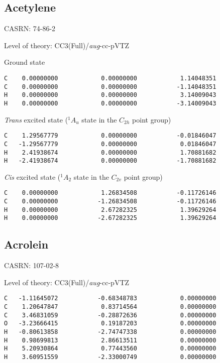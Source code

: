 \documentclass[journal=jctcce,manuscript=article,layout=traditional]{achemso}
\newcommand{\AVTZ}{\emph{aug}-cc-pVTZ}
\begin{document}
\subsection{Acetylene}

CASRN: 74-86-2

\begin{singlespace}
\noindent Level of theory: CC3(Full)/{\AVTZ}
\end{singlespace}

\begin{singlespace}
\noindent Ground state
\begin{verbatim}
C    0.00000000            0.00000000            1.14048351
C    0.00000000            0.00000000           -1.14048351
H    0.00000000            0.00000000            3.14009043
H    0.00000000            0.00000000           -3.14009043
\end{verbatim}
\end{singlespace}

\begin{singlespace}
\noindent \emph{Trans} excited state ($^1A_u$ state in the $C_{2h}$ point group)
\begin{verbatim}
C    1.29567779            0.00000000           -0.01846047
C   -1.29567779            0.00000000            0.01846047
H    2.41938674            0.00000000            1.70881682 
H   -2.41938674            0.00000000           -1.70881682
\end{verbatim}
\end{singlespace}

\begin{singlespace}
\noindent \emph{Cis} excited state ($^1A_2$ state in the $C_{2v}$ point group)
\begin{verbatim}
C    0.00000000            1.26834508           -0.11726146
C    0.00000000           -1.26834508           -0.11726146
H    0.00000000            2.67282325            1.39629264
H    0.00000000           -2.67282325            1.39629264
\end{verbatim}
\end{singlespace}

\subsection{Acrolein}

CASRN: 107-02-8

\begin{singlespace}
\noindent Level of theory: CC3(Full)/{\AVTZ} 
\begin{verbatim}
C   -1.11645072           -0.68348783            0.00000000  
C    1.20647847            0.83714564            0.00000000 
C    3.46831059           -0.28872636            0.00000000 
O   -3.23666415            0.19187203            0.00000000 
H   -0.80613858           -2.74747338            0.00000000
H    0.98699813            2.86613511            0.00000000
H    5.20930864            0.77443560            0.00000000
H    3.60951559           -2.33000749            0.00000000
\end{verbatim}
\end{singlespace}
\end{document}
